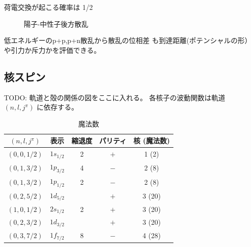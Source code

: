 \documentclass[uplatex,dvipdfmx,a4paper,11pt]{jlreq}
\numberwithin{equation}{section}
\theoremstyle{definition}
\begin{document}
荷電交換が起こる確率は 1/2
\begin{figure}[htpb]
  \centering
  \caption{陽⼦-中性⼦後⽅散乱}
\end{figure}

低エネルギーのp+p,p+n散乱から散乱の位相差
も到達距離(ポテンシャルの形）や引⼒か斥⼒かを評価できる。


\subsection{核スピン}
TODO: 軌道と殻の関係の図をここに入れる。
各核子の波動関数は軌道 $(n, l, j^\pi)$ に依存する。
\begin{table}[hbtp]
  \centering
  \begin{tabular}{|c|c|c|c|c|}
    \hline
    $(n, l, j^\pi)$ & 表示         & 縮退度 & パリティ & 核 (魔法数) \\
    \hline \hline
    $(0, 0, 1/2)$   & $1s_{1/2}$ & 2   & $+$  & 1 (2)   \\
    $(0, 1, 3/2)$   & $1p_{3/2}$ & 4   & $-$  & 2 (8)   \\
    $(0, 1, 3/2)$   & $1p_{1/2}$ & 2   & $-$  & 2 (8)   \\
    $(0, 2, 5/2)$   & $1d_{5/2}$ &     & $+$  & 3 (20)  \\
    $(1, 0, 1/2)$   & $2s_{1/2}$ & 2   & $+$  & 3 (20)  \\
    $(0, 2, 3/2)$   & $1d_{3/2}$ &     & $+$  & 3 (20)  \\
    $(0, 3, 7/2)$   & $1f_{7/2}$ & 8   & $-$  & 4 (28)  \\
    \hline
  \end{tabular}
  \caption{魔法数}
  \label{table:}
\end{table}
\end{document}
